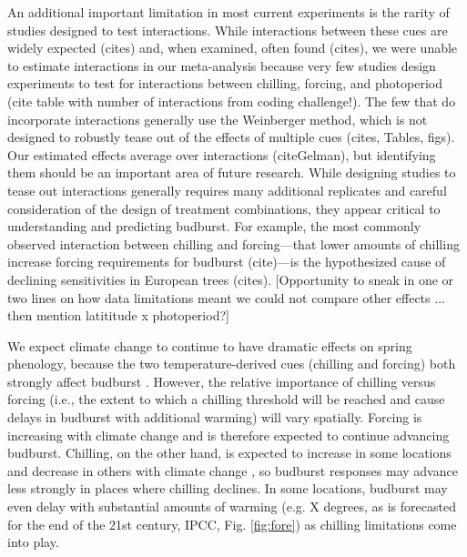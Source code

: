\documentclass[11pt,letter]{article}
\begin{document}
\par An additional important limitation in most current experiments is the rarity of studies designed to test interactions. While interactions between these cues are widely expected (cites) and, when examined, often found (cites), we were unable to estimate interactions in our meta-analysis because very few studies design experiments to test for interactions between chilling, forcing, and photoperiod (cite table with number of interactions from coding challenge!). The few that do incorporate interactions generally use the Weinberger method, which is not designed to robustly tease out of the effects of multiple cues (cites, Tables, figs).  Our estimated effects average over interactions (citeGelman), but identifying them should be an important area of future research. While designing studies to tease out interactions generally requires many additional replicates and careful consideration of the design of treatment combinations, they appear critical to understanding and predicting budburst. For example, the most commonly observed interaction between chilling and forcing---that lower amounts of chilling increase forcing requirements for budburst (cite)---is the hypothesized cause of declining sensitivities in European trees (cites). [Opportunity to sneak in one or two lines on how data limitations meant we could not compare other effects ... then mention latititude x photoperiod?] %

\par We expect climate change to continue to have dramatic effects on spring phenology, because the two temperature-derived cues (chilling and forcing)  both strongly affect budburst  \citep{Laube2014a}. However, the relative importance of chilling versus forcing (i.e., the extent to which a chilling threshold will be reached and cause delays in budburst with additional warming) will vary spatially. Forcing is increasing with climate change and is therefore expected to continue advancing budburst. Chilling, on the other hand, is expected to increase in some locations and decrease in others with climate change  \citep{fraga2019}, so budburst responses may advance less strongly in places where chilling declines. In some locations, budburst may even delay with substantial amounts of warming (e.g. X degrees, as is forecasted for the end of the 21st century, IPCC, Fig. \ref {fig:fore}) as chilling limitations come into play. 
\end{document}
